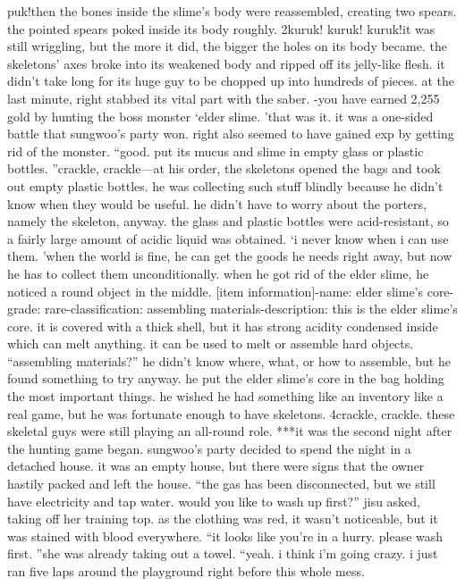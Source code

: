 puk!then the bones inside the slime’s body were reassembled, creating two spears.
 the pointed spears poked inside its body roughly.
2kuruk! kuruk! kuruk!it was still wriggling, but the more it did, the bigger the holes on its body became.
 the skeletons’ axes broke into its weakened body and ripped off its jelly-like flesh.
 it didn’t take long for its huge guy to be chopped up into hundreds of pieces.
 at the last minute, right stabbed its vital part with the saber.
-you have earned 2,255 gold by hunting the boss monster ‘elder slime.
’that was it.
 it was a one-sided battle that sungwoo’s party won.
 right also seemed to have gained exp by getting rid of the monster.
“good.
 put its mucus and slime in empty glass or plastic bottles.
”crackle, crackle—at his order, the skeletons opened the bags and took out empty plastic bottles.
 he was collecting such stuff blindly because he didn’t know when they would be useful.
 he didn’t have to worry about the porters, namely the skeleton, anyway.
 the glass and plastic bottles were acid-resistant, so a fairly large amount of acidic liquid was obtained.
‘i never know when i can use them.
’when the world is fine, he can get the goods he needs right away, but now he has to collect them unconditionally.
 when he got rid of the elder slime, he noticed a round object in the middle.
[item information]-name: elder slime’s core-grade: rare-classification: assembling materials-description: this is the elder slime’s core.
 it is covered with a thick shell, but it has strong acidity condensed inside which can melt anything.
 it can be used to melt or assemble hard objects.
“assembling materials?”
he didn’t know where, what, or how to assemble, but he found something to try anyway.
 he put the elder slime’s core in the bag holding the most important things.
 he wished he had something like an inventory like a real game, but he was fortunate enough to have skeletons.
4crackle, crackle.
these skeletal guys were still playing an all-round role.
***it was the second night after the hunting game began.
 sungwoo’s party decided to spend the night in a detached house.
 it was an empty house, but there were signs that the owner hastily packed and left the house.
“the gas has been disconnected, but we still have electricity and tap water.
 would you like to wash up first?” jisu asked, taking off her training top.
 as the clothing was red, it wasn’t noticeable, but it was stained with blood everywhere.
“it looks like you’re in a hurry.
 please wash first.
”she was already taking out a towel.
“yeah.
 i think i’m going crazy.
 i just ran five laps around the playground right before this whole mess.
